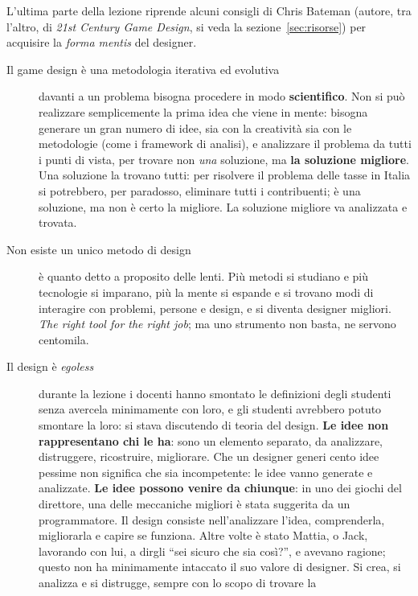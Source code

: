 L'ultima parte della lezione riprende alcuni consigli di Chris Bateman
(autore, tra l'altro, di \emph{21st Century Game Design}, si veda la
sezione~\ref{sec:risorse}) per acquisire la \emph{forma mentis} del designer.

\begin{description}
  \item[Il game design è una metodologia iterativa ed evolutiva] davanti a un
        problema bisogna procedere in modo \textbf{scientifico}. Non si può
        realizzare semplicemente la prima idea che viene in mente: bisogna
        generare un gran numero di idee, sia con la creatività sia con le
        metodologie (come i framework di analisi), e analizzare il problema da
        tutti i punti di vista, per trovare non \emph{una} soluzione, ma
        \textbf{la soluzione migliore}. Una soluzione la trovano tutti: per
        risolvere il problema delle tasse in Italia si potrebbero, per
        paradosso, eliminare tutti i contribuenti; è una soluzione, ma non è
        certo la migliore. La soluzione migliore va analizzata e trovata.
  \item[Non esiste un unico metodo di design] è quanto detto a proposito
        delle lenti. Più metodi si studiano e più tecnologie si imparano, più la
        mente si espande e si trovano modi di interagire con problemi, persone e
        design, e si diventa designer migliori. \emph{The right tool for the
        right job}; ma uno strumento non basta, ne servono centomila.
  \item[Il design è \emph{egoless}] durante la lezione i docenti hanno
        smontato le definizioni degli studenti senza avercela minimamente con
        loro, e gli studenti avrebbero potuto smontare la loro: si stava
        discutendo di teoria del design. \textbf{Le idee non rappresentano chi
        le ha}: sono un elemento separato, da analizzare, distruggere,
        ricostruire, migliorare. Che un designer generi cento idee pessime non
        significa che sia incompetente: le idee vanno generate e analizzate.
        \textbf{Le idee possono venire da chiunque}: in uno dei giochi del
        direttore, una delle meccaniche migliori è stata suggerita da un
        programmatore. Il design consiste nell'analizzare l'idea, comprenderla,
        migliorarla e capire se funziona. Altre volte è stato Mattia, o Jack,
        lavorando con lui, a dirgli ``sei sicuro che sia così?'', e avevano
        ragione; questo non ha minimamente intaccato il suo valore di designer.
        Si crea, si analizza e si distrugge, sempre con lo scopo di trovare la

\end{description}
